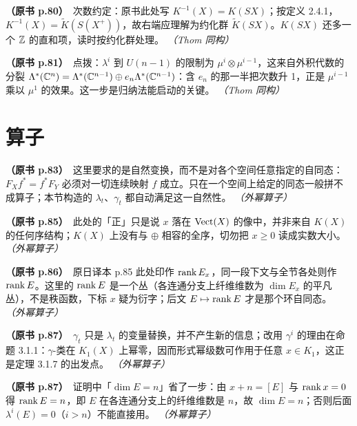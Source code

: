 \noindent \textbf{（原书 p.80）}\ 次数约定：原书此处写 $K^{-1}(X)=K(SX)$；按定义 2.4.1，$K^{-1}(X)=\tilde K(S(X^+))$，故右端应理解为约化群 $\tilde K(SX)$。$K(SX)$ 还多一个 $\mathbb{Z}$ 的直和项，读时按约化群处理。 \textit{（Thom 同构）}\par\smallskip

\noindent \textbf{（原书 p.81）}\ 点拨：$\lambda^i$ 到 $U(n-1)$ 的限制为 $\mu^i\otimes\mu^{i-1}$，这来自外积代数的分裂 $\Lambda^*(\mathbb{C}^n)=\Lambda^*(\mathbb{C}^{n-1})\oplus e_n\Lambda^*(\mathbb{C}^{n-1})$：含 $e_n$ 的那一半把次数升 1，正是 $\mu^{i-1}$ 乘以 $\mu^1$ 的效果。这一步是归纳法能启动的关键。 \textit{（Thom 同构）}\par\smallskip

\section*{算子}

\noindent \textbf{（原书 p.83）}\ 这里要求的是自然变换，而不是对各个空间任意指定的自同态：$F_X f^*=f^*F_Y$ 必须对一切连续映射 $f$ 成立。只在一个空间上给定的同态一般拼不成算子；本节构造的 $\lambda_t$、$\gamma_t$ 都自动满足这一自然性。 \textit{（外幂算子）}\par\smallskip

\noindent \textbf{（原书 p.85）}\ 此处的「正」只是说 $x$ 落在 $\operatorname{Vect}(X)$ 的像中，并非来自 $K(X)$ 的任何序结构；$K(X)$ 上没有与 $\oplus$ 相容的全序，切勿把 $x\ge 0$ 读成实数大小。 \textit{（外幂算子）}\par\smallskip

\noindent \textbf{（原书 p.86）}\ 原日译本 p.85 此处印作 $\operatorname{rank} E_x$，同一段下文与全节各处则作 $\operatorname{rank} E$。这里的 $\operatorname{rank} E$ 是一个丛（各连通分支上纤维维数为 $\dim E_x$ 的平凡丛），不是秩函数，下标 $x$ 疑为衍字；后文 $E\mapsto\operatorname{rank} E$ 才是那个环自同态。 \textit{（外幂算子）}\par\smallskip

\noindent \textbf{（原书 p.87）}\ $\gamma_t$ 只是 $\lambda_t$ 的变量替换，并不产生新的信息；改用 $\gamma^i$ 的理由在命题 3.1.1：$\gamma$-类在 $K_1(X)$ 上幂零，因而形式幂级数可作用于任意 $x\in K_1$，这正是定理 3.1.7 的出发点。 \textit{（外幂算子）}\par\smallskip

\noindent \textbf{（原书 p.87）}\ 证明中「$\dim E=n$」省了一步：由 $x+n=[E]$ 与 $\operatorname{rank} x=0$ 得 $\operatorname{rank} E=n$，即 $E$ 在各连通分支上的纤维维数是 $n$，故 $\dim E=n$；否则后面 $\lambda^i(E)=0$（$i>n$）不能直接用。 \textit{（外幂算子）}\par\smallskip

